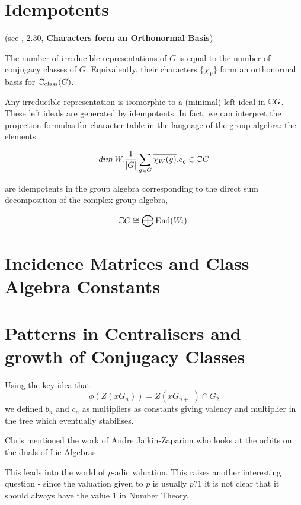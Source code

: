 \section{Idempotents}


\begin{theorem}(see \cite{fulton}, 2.30, \textbf{Characters form an Orthonormal
Basis})

The number of irreducible representations of $G$ is equal to the number of
conjugacy classes of $G$. Equivalently, their characters $\{ {\chi}_V \}$
form an orthonormal basis for $\mathbb C _{\text{class}} (G)$.

\end{theorem}

Any irreducible representation is isomorphic to a (minimal) left ideal in
$\mathbb C G$. These left ideals are generated by idempotents. In fact, we can
interpret the projection formulas for character table in the language of
the group algebra: the elements

$$ dim \, W . \frac{1}{|G|}\sum_{g \in G} \overline{\chi_W (g)} . e_g \in
\mathbb C G$$

are idempotents in the group algebra corresponding to the direct sum
decomposition of the complex group algebra,

$$\mathbb C G \cong \bigoplus \text{End}(W_i).$$





\section{Incidence Matrices and Class Algebra Constants}

\section{Patterns in Centralisers and growth of Conjugacy Classes}

Using the key idea that
$$\phi(Z(xG_n)) = Z(xG_{n+1}) \cap G_2$$
we defined $b_n$ and $c_n$ as multipliers as constants giving valency and multiplier in the tree which eventually stabilises.

Chris mentioned the work of Andre Jaikin-Zaparion who looks at the orbits on the duals of Lie Algebras.

This leads into the world of $p$-adic valuation. This raises another interesting question - since the valuation given to $p$ is usually $p ? 1$ it is not clear that it should always have the value $1$ in Number Theory.

